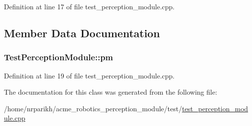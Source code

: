 Definition at line 17 of file test\+\_\+perception\+\_\+module.\+cpp.



\subsection{Member Data Documentation}
\subsubsection[{\texorpdfstring{pm}{pm}}]{ Test\+Perception\+Module\+::pm\hspace{0.3cm}{\ttfamily [protected]}}\hypertarget{class_test_perception_module_a71860459e03b86cd747f283436bcd757}{}\label{class_test_perception_module_a71860459e03b86cd747f283436bcd757}


Definition at line 19 of file test\+\_\+perception\+\_\+module.\+cpp.



The documentation for this class was generated from the following file\+:\begin{DoxyCompactItemize}
\item 
/home/nrparikh/acme\+\_\+robotics\+\_\+perception\+\_\+module/test/\hyperlink{test__perception__module_8cpp}{test\+\_\+perception\+\_\+module.\+cpp}\end{DoxyCompactItemize}
